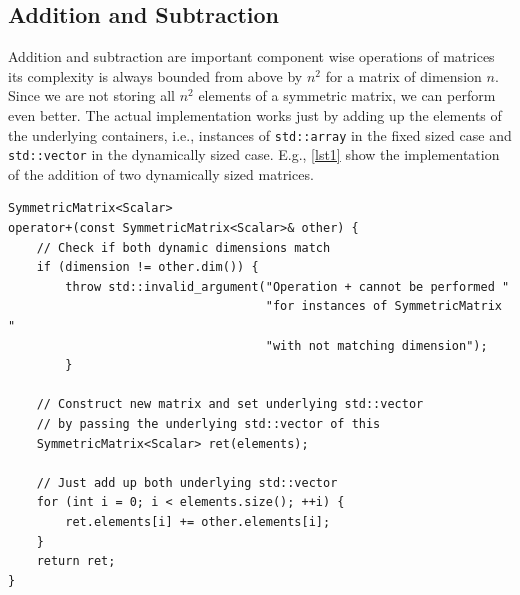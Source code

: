 \documentclass[a4wide]{scrartcl}
\begin{document}
\subsection{Addition and Subtraction}
Addition and subtraction are important component wise operations of matrices its complexity is always bounded from above by $n^2$ for a matrix of dimension $n$. Since we are not storing all $n^2$ elements of a symmetric matrix, we can perform even better.\newline
The actual implementation works just by adding up the elements of the underlying containers, i.e., instances of \texttt{std::array} in the fixed sized case and \texttt{std::vector} in the dynamically sized case. E.g., \autoref{lst1} show the implementation of the addition of two dynamically sized matrices.
\begin{table}
\begin{lstlisting}[caption={Overloaded operator $+$ for the addition of two dynamically sized matrices.},label=lst1]
SymmetricMatrix<Scalar>
operator+(const SymmetricMatrix<Scalar>& other) {
    // Check if both dynamic dimensions match
    if (dimension != other.dim()) {
        throw std::invalid_argument("Operation + cannot be performed "
                                    "for instances of SymmetricMatrix "
                                    "with not matching dimension");
        }

    // Construct new matrix and set underlying std::vector 
    // by passing the underlying std::vector of this
    SymmetricMatrix<Scalar> ret(elements);      

    // Just add up both underlying std::vector
    for (int i = 0; i < elements.size(); ++i) {
        ret.elements[i] += other.elements[i];
    }
    return ret;
}
\end{lstlisting}
\end{table}
\end{document}
